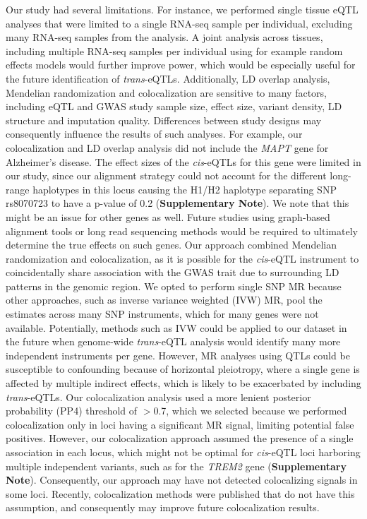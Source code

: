 Our study had several limitations. For instance, we performed single tissue eQTL analyses that were limited to a single RNA-seq sample per individual, excluding many RNA-seq samples from the analysis. A joint analysis across tissues, including multiple RNA-seq samples per individual using for example random effects models would further improve power\cite{davenportDiscoveringVivoCytokineeQTL2018,gtexconsortiumGeneticEffectsGene2017}, which would be especially useful for the future identification of \textit{trans}-eQTLs. Additionally, LD overlap analysis, Mendelian randomization and colocalization are sensitive to many factors, including eQTL and GWAS study sample size, effect size, variant density, LD structure and imputation quality. Differences between study designs may consequently influence the results of such analyses. For example, our colocalization and LD overlap analysis did not include the \textit{MAPT} gene for Alzheimer’s disease. The effect sizes of the \textit{cis}-eQTLs for this gene were limited in our study, since our alignment strategy could not account for the different long-range haplotypes in this locus causing the H1/H2 haplotype separating SNP rs8070723 to have a p-value of 0.2 (\textbf{Supplementary Note}). We note that this might be an issue for other genes as well. Future studies using graph-based alignment tools or long read sequencing methods would be required to ultimately determine the true effects on such genes. Our approach combined Mendelian randomization and colocalization, as it is possible for the \textit{cis}-eQTL instrument to coincidentally share association with the GWAS trait due to surrounding LD patterns in the genomic region. We opted to perform single SNP MR because other approaches, such as inverse variance weighted\cite{hemaniMRBasePlatformSupports2018} (IVW) MR, pool the estimates across many SNP instruments, which for many genes were not available. Potentially, methods such as IVW could be applied to our dataset in the future when genome-wide \textit{trans}-eQTL analysis would identify many more independent instruments per gene. However, MR analyses using QTLs could be susceptible to confounding because of horizontal pleiotropy\cite{hemaniEvaluatingPotentialRole2018}, where a single gene is affected by multiple indirect effects, which is likely to be exacerbated by including \textit{trans}-eQTLs. Our colocalization analysis used a more lenient posterior probability (PP4) threshold of $>$0.7, which we selected because we performed colocalization only in loci having a significant MR signal, limiting potential false positives. However, our colocalization approach assumed the presence of a single association in each locus, which might not be optimal for \textit{cis}-eQTL loci harboring multiple independent variants, such as for the \textit{TREM2} gene (\textbf{Supplementary Note}). Consequently, our approach may have not detected colocalizing signals in some loci. Recently, colocalization methods were published\cite{wallaceElicitingPriorsRelaxing2020} that do not have this assumption, and consequently may improve future colocalization results.      


